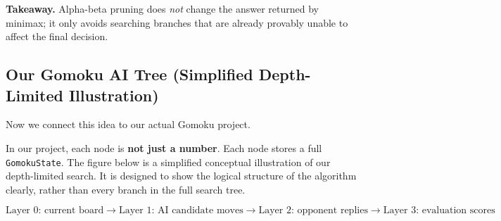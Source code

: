 \documentclass[11pt]{article}
\begin{document}
\noindent
\textbf{Takeaway.} Alpha-beta pruning does \emph{not} change the answer returned by minimax; it only avoids searching branches that are already provably unable to affect the final decision.

\subsection*{Our Gomoku AI Tree (Simplified Depth-Limited Illustration)}

Now we connect this idea to our actual Gomoku project.

In our project, each node is \textbf{not just a number}. Each node stores a full \texttt{GomokuState}. The figure below is a simplified conceptual illustration of our depth-limited search. It is designed to show the logical structure of the algorithm clearly, rather than every branch in the full search tree.

\[
\text{Layer 0: current board}
\rightarrow
\text{Layer 1: AI candidate moves}
\rightarrow
\text{Layer 2: opponent replies}
\rightarrow
\text{Layer 3: evaluation scores}
\]
\end{document}
